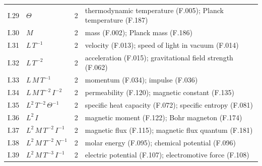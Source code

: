 {\begin{longtable}{@{}llr>{\raggedright\arraybackslash}p{11.6cm}@{}}
I.29 & $\Theta$ & 2 & thermodynamic temperature (F.005); Planck temperature (F.187) \\
I.30 & $M$ & 2 & mass (F.002); Planck mass (F.186) \\
I.31 & $L\,T^{-1}$ & 2 & velocity (F.013); speed of light in vacuum (F.014) \\
I.32 & $L\,T^{-2}$ & 2 & acceleration (F.015); gravitational field strength (F.062) \\
I.33 & $L\,M\,T^{-1}$ & 2 & momentum (F.034); impulse (F.036) \\
I.34 & $L\,M\,T^{-2}\,I^{-2}$ & 2 & permeability (F.120); magnetic constant (F.135) \\
I.35 & $L^{2}\,T^{-2}\,\Theta^{-1}$ & 2 & specific heat capacity (F.072); specific entropy (F.081) \\
I.36 & $L^{2}\,I$ & 2 & magnetic moment (F.122); Bohr magneton (F.174) \\
I.37 & $L^{2}\,M\,T^{-2}\,I^{-1}$ & 2 & magnetic flux (F.115); magnetic flux quantum (F.181) \\
I.38 & $L^{2}\,M\,T^{-2}\,N^{-1}$ & 2 & molar energy (F.095); chemical potential (F.096) \\
I.39 & $L^{2}\,M\,T^{-3}\,I^{-1}$ & 2 & electric potential (F.107); electromotive force (F.108) \\
\end{longtable}}
